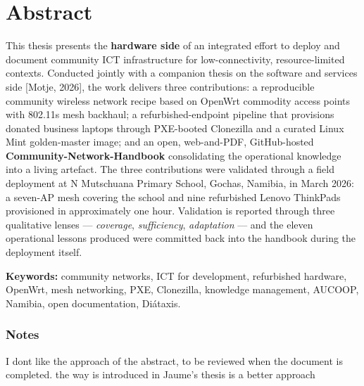 \chapter*{Abstract}

This thesis presents the \textbf{hardware side} of an integrated effort
to deploy and document community ICT infrastructure for
low-connectivity, resource-limited contexts. Conducted jointly with a
companion thesis on the software and services side {[}Motje, 2026{]},
the work delivers three contributions: a reproducible community wireless
network recipe based on OpenWrt commodity access points with 802.11s
mesh backhaul; a refurbished-endpoint pipeline that provisions donated
business laptops through PXE-booted Clonezilla and a curated Linux Mint
golden-master image; and an open, web-and-PDF, GitHub-hosted
\textbf{Community-Network-Handbook} consolidating the operational
knowledge into a living artefact. The three contributions were validated
through a field deployment at N Mutschuana Primary School, Gochas,
Namibia, in March 2026: a seven-AP mesh covering the school and nine
refurbished Lenovo ThinkPads provisioned in approximately one hour.
Validation is reported through three qualitative lenses ---
\emph{coverage}, \emph{sufficiency}, \emph{adaptation} --- and the
eleven operational lessons produced were committed back into the
handbook during the deployment itself.

\textbf{Keywords:} community networks, ICT for development, refurbished
hardware, OpenWrt, mesh networking, PXE, Clonezilla, knowledge
management, AUCOOP, Namibia, open documentation, Diátaxis.

\hypertarget{notes}{%
\subsection{Notes}\label{notes}}

I dont like the approach of the abstract, to be reviewed when the
document is completed. the way is introduced in Jaume's thesis is a
better approach
